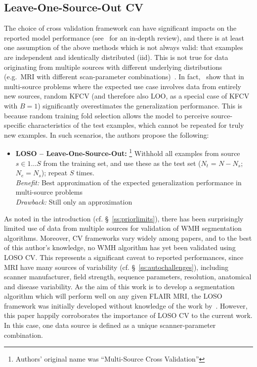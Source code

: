 \subsection{Leave-One-Source-Out CV}
The choice of cross validation framework can have significant impacts
on the reported model performance (see~\cite{Arlot2010} for an in-depth review),
and there is at least one assumption of the above methods which is not always valid:
that examples are independent and identically distributed (iid).
This is not true for data originating from multiple sources with different underlying distributions
(e.g.\ MRI with different scan-parameter combinations)~\cite{Geras2013}.
In fact,~\citeauthor{Geras2013} show that in multi-source problems
where the expected use case involves data from entirely new sources,
random KFCV (and therefore also LOO, as a special case of KFCV with $B=1$)
significantly overestimates the generalization performance.
This is because random training fold selection allows the model
to perceive source-specific characteristics of the test examples,
which cannot be repeated for truly new examples.
In such scenarios, the authors propose the following:
\begin{itemize}
  \item\textbf{LOSO -- Leave-One-Source-Out:}%
    \footnote{Authors' original name was ``Multi-Source Cross Validation''}
    Withhold all examples from source $s\in 1\dots S$ from the training set,
    and use these as the test set ($N_t$ = $N-N_s$; $N_e = N_s$);
    repeat $S$ times.
  \\\textit{Benefit:} Best approximation of the expected generalization performance
  in multi-source problems
  \\\textit{Drawback:} Still only an approximation
\end{itemize}
As noted in the introduction (cf. \S~\ref{ss:priorlimits}),
there has been surprisingly limited use of data from multiple sources
for validation of WMH segmentation algorithms.
Moreover, CV frameworks vary widely among papers, and to the best of this author's knowledge,
no WMH algorithm has yet been validated using LOSO CV\@.
This represents a significant caveat to reported performances,
since MRI have many sources of variability (cf. \S~\ref{ss:autochallenges}),
including scanner manufacturer, field strength, sequence parameters, resolution,
anatomical and disease variability.
As the aim of this work is to develop a segmentation algorithm
which will perform well on any given FLAIR MRI,
the LOSO framework was initially developed without knowledge of the work by~\citeauthor{Geras2013}.
However, this paper happily corroborates the importance of LOSO CV to the current work.
In this case, one data source is defined as a unique scanner-parameter combination.
